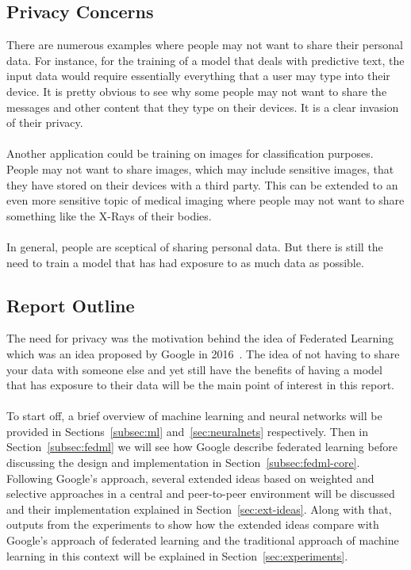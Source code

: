 \documentclass[12pt]{article}
\begin{document}
\subsection{Privacy Concerns}
There are numerous examples where people may not want to share their personal data. For instance, for the training of a model that deals with predictive text, the input data would require essentially everything that a user may type into their device. It is pretty obvious to see why some people may not want to share the messages and other content that they type on their devices. It is a clear invasion of their privacy.
\\\\
Another application could be training on images for classification purposes. People may not want to share images, which may include sensitive images, that they have stored on their devices with a third party. This can be extended to an even more sensitive topic of medical imaging where people may not want to share something like the X-Rays of their bodies.
\\\\
In general, people are sceptical of sharing personal data. But there is still the need to train a model that has had exposure to as much data as possible. 
\subsection{Report Outline}
The need for privacy was the motivation behind the idea of Federated Learning which was an idea proposed by Google in 2016~\cite{konen2016federated}. The idea of not having to share your data with someone else and yet still have the benefits of having a model that has exposure to their data will be the main point of interest in this report. 
\\\\
To start off, a brief overview of machine learning and neural networks will be provided in Sections~\ref{subsec:ml} and~\ref{sec:neuralnets} respectively. Then in Section~\ref{subsec:fedml} we will see how Google describe federated learning before discussing the design and implementation in Section~\ref{subsec:fedml-core}. Following Google's approach, several extended ideas based on weighted and selective approaches in a central and peer-to-peer environment will be discussed and their implementation explained in Section~\ref{sec:ext-ideas}. Along with that, outputs from the experiments to show how the extended ideas compare with Google's approach of federated learning and the traditional approach of machine learning in this context will be explained in Section~\ref{sec:experiments}. 
\end{document}
